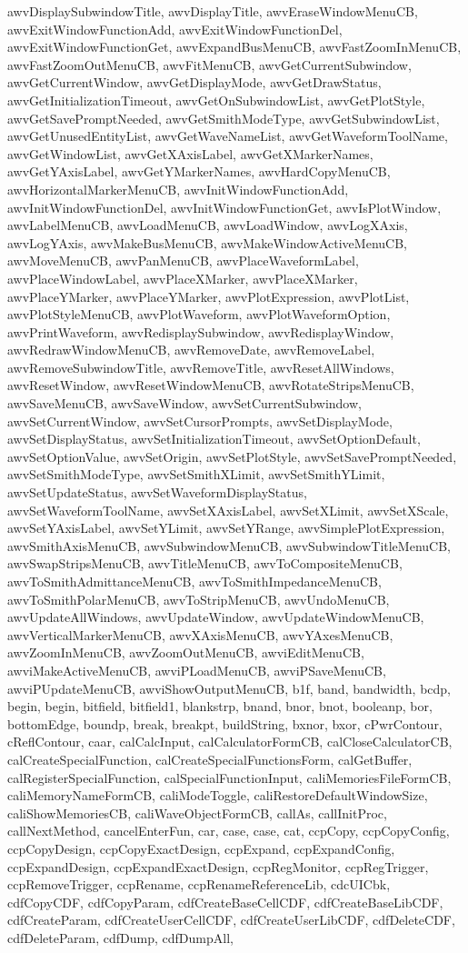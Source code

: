 {{awvDisplaySubwindowTitle, awvDisplayTitle, awvEraseWindowMenuCB, awvExitWindowFunctionAdd, awvExitWindowFunctionDel, awvExitWindowFunctionGet, awvExpandBusMenuCB, awvFastZoomInMenuCB, awvFastZoomOutMenuCB, awvFitMenuCB, awvGetCurrentSubwindow, awvGetCurrentWindow, awvGetDisplayMode, awvGetDrawStatus, awvGetInitializationTimeout, awvGetOnSubwindowList, awvGetPlotStyle, awvGetSavePromptNeeded, awvGetSmithModeType, awvGetSubwindowList, awvGetUnusedEntityList, awvGetWaveNameList, awvGetWaveformToolName, awvGetWindowList, awvGetXAxisLabel, awvGetXMarkerNames, awvGetYAxisLabel, awvGetYMarkerNames, awvHardCopyMenuCB, awvHorizontalMarkerMenuCB, awvInitWindowFunctionAdd, awvInitWindowFunctionDel, awvInitWindowFunctionGet, awvIsPlotWindow, awvLabelMenuCB, awvLoadMenuCB, awvLoadWindow, awvLogXAxis, awvLogYAxis, awvMakeBusMenuCB, awvMakeWindowActiveMenuCB, awvMoveMenuCB, awvPanMenuCB, awvPlaceWaveformLabel, awvPlaceWindowLabel, awvPlaceXMarker, awvPlaceXMarker, awvPlaceYMarker, awvPlaceYMarker, awvPlotExpression, awvPlotList, awvPlotStyleMenuCB, awvPlotWaveform, awvPlotWaveformOption, awvPrintWaveform, awvRedisplaySubwindow, awvRedisplayWindow, awvRedrawWindowMenuCB, awvRemoveDate, awvRemoveLabel, awvRemoveSubwindowTitle, awvRemoveTitle, awvResetAllWindows, awvResetWindow, awvResetWindowMenuCB, awvRotateStripsMenuCB, awvSaveMenuCB, awvSaveWindow, awvSetCurrentSubwindow, awvSetCurrentWindow, awvSetCursorPrompts, awvSetDisplayMode, awvSetDisplayStatus, awvSetInitializationTimeout, awvSetOptionDefault, awvSetOptionValue, awvSetOrigin, awvSetPlotStyle, awvSetSavePromptNeeded, awvSetSmithModeType, awvSetSmithXLimit, awvSetSmithYLimit, awvSetUpdateStatus, awvSetWaveformDisplayStatus, awvSetWaveformToolName, awvSetXAxisLabel, awvSetXLimit, awvSetXScale, awvSetYAxisLabel, awvSetYLimit, awvSetYRange, awvSimplePlotExpression, awvSmithAxisMenuCB, awvSubwindowMenuCB, awvSubwindowTitleMenuCB, awvSwapStripsMenuCB, awvTitleMenuCB, awvToCompositeMenuCB, awvToSmithAdmittanceMenuCB, awvToSmithImpedanceMenuCB, awvToSmithPolarMenuCB, awvToStripMenuCB, awvUndoMenuCB, awvUpdateAllWindows, awvUpdateWindow, awvUpdateWindowMenuCB, awvVerticalMarkerMenuCB, awvXAxisMenuCB, awvYAxesMenuCB, awvZoomInMenuCB, awvZoomOutMenuCB, awviEditMenuCB, awviMakeActiveMenuCB, awviPLoadMenuCB, awviPSaveMenuCB, awviPUpdateMenuCB, awviShowOutputMenuCB, b1f, band, bandwidth, bcdp, begin, begin, bitfield, bitfield1, blankstrp, bnand, bnor, bnot, booleanp, bor, bottomEdge, boundp, break, breakpt, buildString, bxnor, bxor, cPwrContour, cReflContour, caar, calCalcInput, calCalculatorFormCB, calCloseCalculatorCB, calCreateSpecialFunction, calCreateSpecialFunctionsForm, calGetBuffer, calRegisterSpecialFunction, calSpecialFunctionInput, caliMemoriesFileFormCB, caliMemoryNameFormCB, caliModeToggle, caliRestoreDefaultWindowSize, caliShowMemoriesCB, caliWaveObjectFormCB, callAs, callInitProc, callNextMethod, cancelEnterFun, car, case, case, cat, ccpCopy, ccpCopyConfig, ccpCopyDesign, ccpCopyExactDesign, ccpExpand, ccpExpandConfig, ccpExpandDesign, ccpExpandExactDesign, ccpRegMonitor, ccpRegTrigger, ccpRemoveTrigger, ccpRename, ccpRenameReferenceLib, cdcUICbk, cdfCopyCDF, cdfCopyParam, cdfCreateBaseCellCDF, cdfCreateBaseLibCDF, cdfCreateParam, cdfCreateUserCellCDF, cdfCreateUserLibCDF, cdfDeleteCDF, cdfDeleteParam, cdfDump, cdfDumpAll, }}
